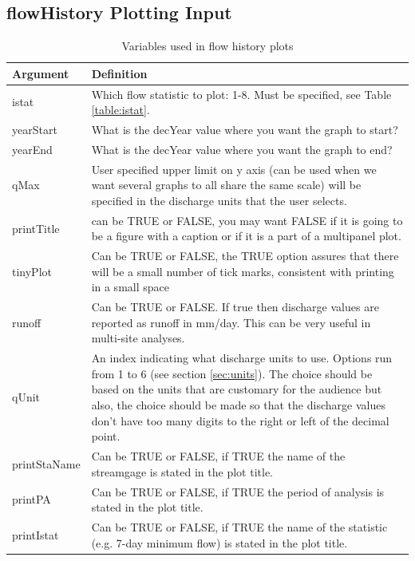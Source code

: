\documentclass[a4paper,11pt]{article}\usepackage{graphicx, color}
\begin{document}
\subsection{flowHistory Plotting Input}
\label{sec:flowHistoryVariables}
\begin{table}[ht]
\caption{Variables used in flow history plots  \label{tab:flowHistoryVariables}}
\begin{tabularx}{\textwidth}{lX}
\hline
  \textbf{Argument} & \textbf{Definition} \\
\hline
istat & Which flow statistic to plot: 1-8.  Must be specified, see Table \ref{table:istat}. \\
yearStart\footnotemark[1] & What is the decYear value where you want the graph to start? \\
yearEnd\footnotemark[1] & What is the decYear value where you want the graph to end? \\
qMax & User specified upper limit on y axis (can be used when we want several graphs to all share the same scale) will be specified in the discharge units that the user selects. \\
printTitle & can be TRUE or FALSE, you may want FALSE if it is going to be a figure with a caption or if it is a part of a multipanel plot. \\
tinyPlot & Can be TRUE or FALSE, the TRUE option assures that there will be a small number of tick marks, consistent with printing in a small space \\
runoff & Can be TRUE or FALSE.  If true then discharge values are reported as runoff in mm/day.  This can be very useful in multi-site analyses. \\
qUnit & An index indicating what discharge units to use.  Options run from 1 to 6 (see section \ref{sec:units}).  The choice should be based on the units that are customary for the audience but also, the choice should be made so that the discharge values don't have too many digits to the right or left of the decimal point.\\
printStaName\footnotemark[2] & Can be TRUE or FALSE, if TRUE the name of the streamgage is stated in the plot title. \\
printPA\footnotemark[2] & Can be TRUE or FALSE, if TRUE the period of analysis is stated in the plot title. \\
printIstat\footnotemark[2] & Can be TRUE or FALSE, if TRUE the name of the statistic (e.g. 7-day minimum flow) is stated in the plot title. \\

\hline
\end{tabularx}

\end{table}
\end{document}
